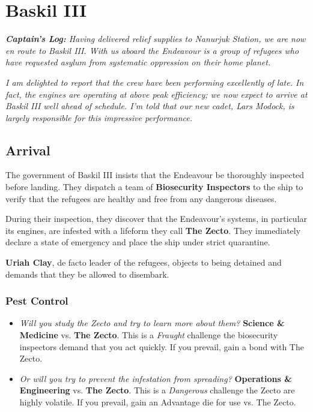\documentclass[11pt, a5paper, parskip=half-, DIV=12]{scrartcl}
\begin{document}
\section*{Baskil III}
\textit{\textbf{Captain's Log:} Having delivered relief supplies to Nanurjuk Station, we are now en route to Baskil III. With us aboard the Endeavour is a group of refugees who have requested asylum from systematic oppression on their home planet.}

\textit{I am delighted to report that the crew have been performing excellently of late. In fact, the engines are operating at above peak efficiency; we now expect to arrive at Baskil III well ahead of schedule. I'm told that our new cadet, Lars Modock, is largely responsible for this impressive performance.}

\subsection*{Arrival}
The government of Baskil III insists that the Endeavour be thoroughly inspected before landing. They dispatch a team of \textbf{Biosecurity Inspectors} to the ship to verify that the refugees are healthy and free from any dangerous diseases.

During their inspection, they discover that the Endeavour's systems, in particular its engines, are infested with a lifeform they call \textbf{The Zecto}. They immediately declare a state of emergency and place the ship under strict quarantine.

\textbf{Uriah Clay}, de facto leader of the refugees, objects to being detained and demands that they be allowed to disembark.

\subsubsection*{Pest Control}
\begin{itemize}
	\item \textit{Will you study the Zecto and try to learn more about them?} \textbf{Science \& Medicine} vs. \textbf{The Zecto}. This is a \textit{Fraught} challenge \textemdash{} the biosecurity inspectors demand that you act quickly. If you prevail, gain a bond with The Zecto.  
	\item \textit{Or will you try to prevent the infestation from spreading?} \textbf{Operations \& Engineering} vs. \textbf{The Zecto}. This is a \textit{Dangerous} challenge \textemdash{} the Zecto are highly volatile. If you prevail, gain an Advantage die for use vs. The Zecto.
\end{itemize}
\end{document}
